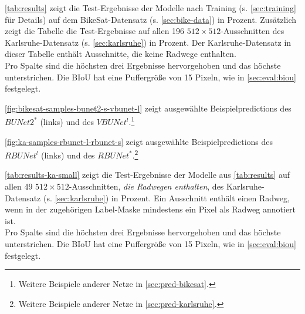 \autoref{tab:results} zeigt die Test-Ergebnisse der Modelle nach Training (s. \autoref{sec:training} für Details) auf dem BikeSat-Datensatz 
(s. \autoref{sec:bike-data}) in Prozent. Zusätzlich zeigt die Tabelle die Test-Ergebnisse auf allen 196 $512{\times}512$-Ausschnitten 
des Karlsruhe-Datensatz (s. \autoref{sec:karlsruhe}) in Prozent. Der Karlsruhe-Datensatz in dieser Tabelle
enthält Ausschnitte, die keine Radwege enthalten. \\ 
Pro Spalte sind die höchsten drei Ergebnisse hervorgehoben und das höchste unterstrichen.
Die \ac{BIoU} hat eine Puffergröße von 15 Pixeln, wie in \autoref{sec:eval:biou} festgelegt.

\autoref{fig:bikesat-samples-bunet2-s-vbunet-l} zeigt ausgewählte Beispielpredictions des $BUNet2^*$ (links) und 
des $VBUNet^l$.\footnote{Weitere Beispiele anderer Netze in \autoref{sec:pred-bikesat}.}

\autoref{fig:ka-samples-rbunet-l-rbunet-s} zeigt ausgewählte Beispielpredictions des $RBUNet^l$ (links) und 
des $RBUNet^*$.\footnote{Weitere Beispiele anderer Netze in \autoref{sec:pred-karlsruhe}.}

\autoref{tab:results-ka-small} zeigt die Test-Ergebnisse der Modelle aus \autoref{tab:results} auf allen 49 $512{\times}512$-Ausschnitten, 
\textit{die Radwegen enthalten}, des Karlsruhe-Datensatz (s. \autoref{sec:karlsruhe}) in Prozent. 
Ein Ausschnitt enthält einen Radweg, wenn in der zugehörigen Label-Maske mindestens ein Pixel als Radweg annotiert ist. \\
Pro Spalte sind die höchsten drei Ergebnisse hervorgehoben und das höchste unterstrichen.
Die \ac{BIoU} hat eine Puffergröße von 15 Pixeln, wie in \autoref{sec:eval:biou} festgelegt.






